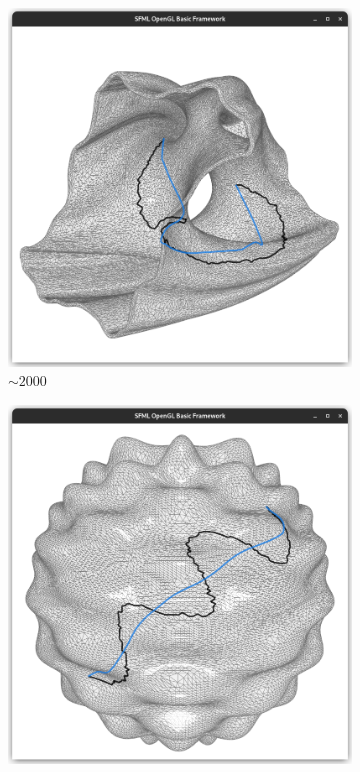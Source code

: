 \documentclass{stdlocal}
\begin{document}
\begin{figure}
  \begin{subfigure}[b]{0.24\linewidth}
    \centering
    \includegraphics[width=\linewidth,trim={15px 20 15 50},clip]{images/julia-geodesic-1.png}
    \caption{$\sim 2000$}
  \end{subfigure}
  \begin{subfigure}[b]{0.24\linewidth}
    \centering
    \includegraphics[width=\linewidth,trim={15px 20 15 50},clip]{images/harmonic-geodesic-1.png}

\end{subfigure}
\end{figure}
\end{document}
